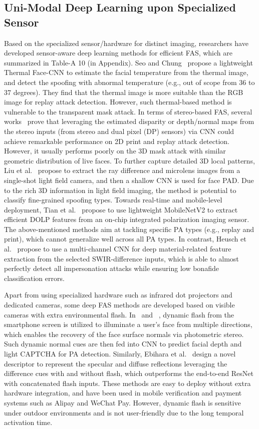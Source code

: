 \documentclass[10pt,journal,compsoc]{IEEEtran}
\begin{document}
\subsection{Uni-Modal Deep Learning upon Specialized Sensor}
Based on the specialized sensor/hardware for distinct imaging, researchers have developed sensor-aware deep learning methods for efficient FAS, which are summarized in Table-A 10 (in Appendix). Seo and Chung~\cite{seo2019face} propose a lightweight Thermal Face-CNN to estimate the facial temperature from the thermal image, and detect the spoofing with abnormal temperature (e.g., out of scope from 36 to 37 degrees). They find that the thermal image is more suitable than the RGB image for replay attack detection. However, such thermal-based method is vulnerable to the transparent mask attack. In terms of stereo-based FAS, several works~\cite{rehman2020slnet,kang2021facial,wu2020single} prove that leveraging the estimated disparity or depth/normal maps from the stereo inputs (from stereo and dual pixel (DP) sensors) via CNN could achieve remarkable performance on 2D print and replay attack detection. However, it usually performs poorly on the 3D mask attack with similar geometric distribution of live faces. To further capture detailed 3D local patterns, Liu et al.~\cite{liu2019light} propose to extract the ray difference and microlens images from a single-shot light field camera, and then a shallow CNN is used for face PAD. Due to the rich 3D information in light field imaging, the method is potential to classify fine-grained spoofing types. Towards real-time and mobile-level deployment, Tian et al.~\cite{tian2020face} propose to use lightweight MobileNetV2 to extract efficient DOLP features from an on-chip integrated polarization imaging sensor. The above-mentioned methods aim at tackling specific PA types (e.g., replay and print), which cannot generalize well across all PA types. In contrast, Heusch et al.~\cite{heusch2020deep} propose to use a multi-channel CNN for deep material-related feature extraction from the selected SWIR-difference inputs, which is able to almost perfectly detect all impersonation attacks while ensuring low bonafide classification errors.


Apart from using specialized hardware such as infrared dot projectors and dedicated cameras, some deep FAS methods are developed based on visible cameras with extra environmental flash. In~\cite{liu2019AuroraGuard} and ~\cite{farrukh2020facerevelio}, dynamic flash from the smartphone screen is utilized to illuminate a user’s face from multiple directions, which enables the recovery of the face surface normals via photometric stereo. Such dynamic normal cues are then fed into CNN to predict facial depth and light CAPTCHA for PA detection. Similarly, Ebihara et al.~\cite{ebihara2019specular} design a novel descriptor to represent the specular and diffuse reflections leveraging the difference cues with and without flash, which outperforms the end-to-end ResNet with concatenated flash inputs. These methods are easy to deploy without extra hardware integration, and have been used in mobile verification and payment systems such as Alipay and WeChat Pay. However, dynamic flash is sensitive under outdoor environments and is not user-friendly due to the long temporal activation time. 
\end{document}
